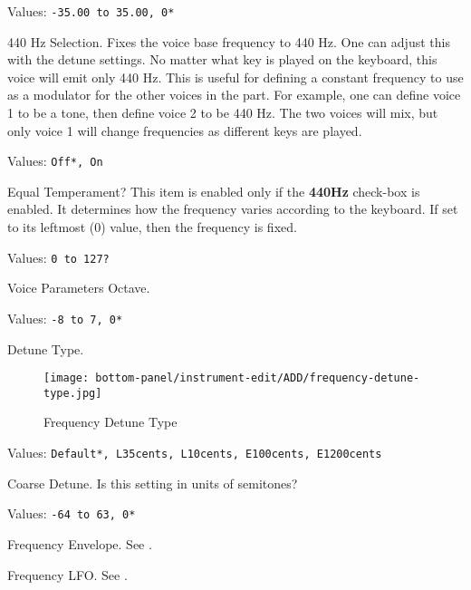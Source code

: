    Values: \texttt{-35.00 to 35.00, 0*}

   440 Hz Selection.
   Fixes the voice base frequency to 440 Hz.
   One can adjust this with the detune settings.
   No matter what key is played on the keyboard, this voice will emit only
   440 Hz.  This is useful for defining a constant frequency to use as a
   modulator for the other voices in the part.
   For example, one can define voice 1 to be a tone, then
   define voice 2 to be 440 Hz.  The two voices will mix, but only voice 1
   will change frequencies as different keys are played.

   Values: \texttt{Off*, On}

   Equal Temperament?
   This item is enabled only if the \textbf{440Hz} check-box is enabled.
   It determines how the frequency varies according to the
   keyboard.  If set to its leftmost (0) value, then the frequency is fixed.

   Values: \texttt{0 to 127?}

   Voice Parameters Octave.

   Values: \texttt{-8 to 7, 0*}

%

   Detune Type.

\begin{figure}[H]
   \centering
   \texttt{[image: bottom-panel/instrument-edit/ADD/frequency-detune-type.jpg]}
   \caption{Frequency Detune Type}
   \label{fig:frequency_detune_tYpe}
\end{figure}

   Values: \texttt{Default*, L35cents, L10cents, E100cents, E1200cents}

   Coarse Detune.
   Is this setting in units of semitones?

   Values: \texttt{-64 to 63, 0*}

   Frequency Envelope.
   See .

   Frequency LFO.
   See .

